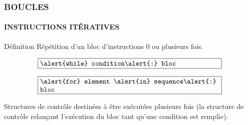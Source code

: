 \begin{frame}
\frametitle{\uppercase{Boucles}}
\framesubtitle{\uppercase{Instructions itératives}}
\begin{block}{Définition}
Répétition d'un bloc d'instructions 0 ou plusieurs fois.

\color{blue}
$$\fbox{\begin{minipage}{9cm}\tt 
\alert{while} condition\alert{:} bloc
\end{minipage}}$$


$$\fbox{\begin{minipage}{9cm}\tt 
\alert{for} element \alert{in} sequence\alert{:} bloc
\end{minipage}}$$
\end{block}

Structures de contrôle destinées à être exécutées plusieurs fois 
(la structure de contrôle relançant l'exécution du bloc 
tant qu'une condition est remplie).

\end{frame}



